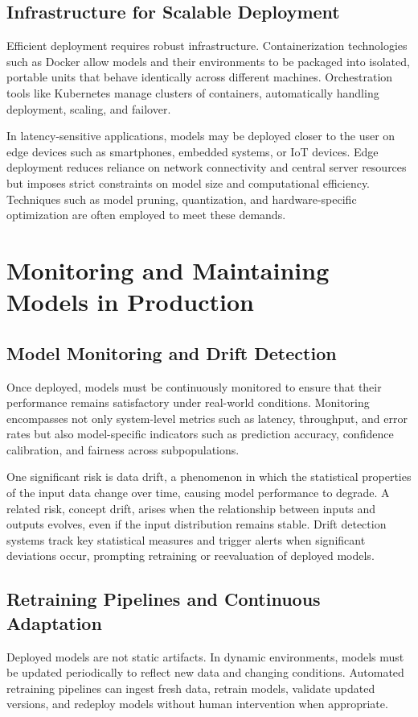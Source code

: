 \documentclass[openany]{book}
\begin{document}
\subsection{Infrastructure for Scalable Deployment}
Efficient deployment requires robust infrastructure. Containerization 
technologies such as Docker allow models and their environments to be packaged 
into isolated, portable units that behave identically across different machines. 
Orchestration tools like Kubernetes manage clusters of containers, automatically 
handling deployment, scaling, and failover.

In latency-sensitive applications, models may be deployed closer to the user on 
edge devices such as smartphones, embedded systems, or IoT devices. Edge 
deployment reduces reliance on network connectivity and central server resources 
but imposes strict constraints on model size and computational efficiency. 
Techniques such as model pruning, quantization, and hardware-specific 
optimization are often employed to meet these demands.

\section{Monitoring and Maintaining Models in Production}

\subsection{Model Monitoring and Drift Detection}
Once deployed, models must be continuously monitored to ensure that their 
performance remains satisfactory under real-world conditions. Monitoring 
encompasses not only system-level metrics such as latency, throughput, and 
error rates but also model-specific indicators such as prediction accuracy, 
confidence calibration, and fairness across subpopulations.

One significant risk is data drift, a phenomenon in which the statistical 
properties of the input data change over time, causing model performance to 
degrade. A related risk, concept drift, arises when the relationship between 
inputs and outputs evolves, even if the input distribution remains stable. Drift 
detection systems track key statistical measures and trigger alerts when 
significant deviations occur, prompting retraining or reevaluation of deployed 
models.

\subsection{Retraining Pipelines and Continuous Adaptation}
Deployed models are not static artifacts. In dynamic environments, models must 
be updated periodically to reflect new data and changing conditions. Automated 
retraining pipelines can ingest fresh data, retrain models, validate updated 
versions, and redeploy models without human intervention when appropriate.
\end{document}
